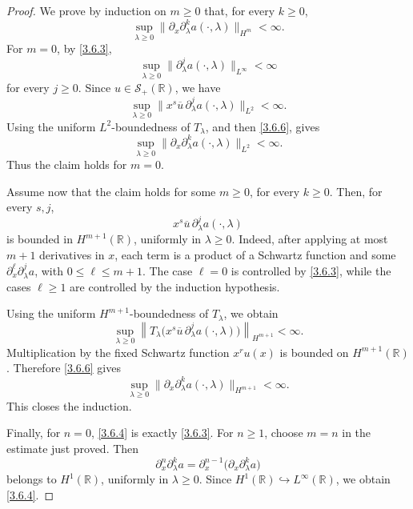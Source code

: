 \documentclass[10pt]{article}
\numberwithin{equation}{section}
\numberwithin{theorem}{section}
\begin{document}
\begin{proof}
We prove by induction on \(m\ge0\) that, for every \(k\ge0\),
\[
\sup_{\lambda\ge0}
\|\partial_x\partial_\lambda^k a(\cdot,\lambda)\|_{H^m}
<\infty .
\]
For \(m=0\), by \eqref{3.6.3},
\[
\sup_{\lambda\ge0}
\|\partial_\lambda^j a(\cdot,\lambda)\|_{L^\infty}<\infty
\]
for every \(j\ge0\). Since \(u\in\mathcal S_+(\mathbb R)\), we have
\[
\sup_{\lambda\ge0}
\|x^s\overline u\,\partial_\lambda^j a(\cdot,\lambda)\|_{L^2}
<\infty .
\]
Using the uniform \(L^2\)-boundedness of \(T_\lambda\), and then \eqref{3.6.6}, gives
\[
\sup_{\lambda\ge0}
\|\partial_x\partial_\lambda^k a(\cdot,\lambda)\|_{L^2}
<\infty .
\]
Thus the claim holds for \(m=0\).

Assume now that the claim holds for some \(m\ge0\), for every \(k\ge0\). Then, for every
\(s,j\),
\[
x^s\overline u\,\partial_\lambda^j a(\cdot,\lambda)
\]
is bounded in \(H^{m+1}(\mathbb R)\), uniformly in \(\lambda\ge0\). Indeed, after applying
at most \(m+1\) derivatives in \(x\), each term is a product of a Schwartz function and
some \(\partial_x^\ell\partial_\lambda^j a\), with \(0\le \ell\le m+1\). The case
\(\ell=0\) is controlled by \eqref{3.6.3}, while the cases \(\ell\ge1\) are controlled by
the induction hypothesis.

Using the uniform \(H^{m+1}\)-boundedness of \(T_\lambda\), we obtain
\[
\sup_{\lambda\ge0}
\left\|
T_\lambda\bigl(x^s\overline u\,\partial_\lambda^j a(\cdot,\lambda)\bigr)
\right\|_{H^{m+1}}
<\infty .
\]
Multiplication by the fixed Schwartz function \(x^r u(x)\) is bounded on
\(H^{m+1}(\mathbb R)\). Therefore \eqref{3.6.6} gives
\[
\sup_{\lambda\ge0}
\|\partial_x\partial_\lambda^k a(\cdot,\lambda)\|_{H^{m+1}}
<\infty .
\]
This closes the induction.

Finally, for \(n=0\), \eqref{3.6.4} is exactly \eqref{3.6.3}. For \(n\ge1\), choose
\(m=n\) in the estimate just proved. Then
\[
\partial_x^n\partial_\lambda^k a
=
\partial_x^{n-1}\bigl(\partial_x\partial_\lambda^k a\bigr)
\]
belongs to \(H^1(\mathbb R)\), uniformly in \(\lambda\ge0\). Since
\(H^1(\mathbb R)\hookrightarrow L^\infty(\mathbb R)\), we obtain \eqref{3.6.4}.


\end{proof}
\end{document}
